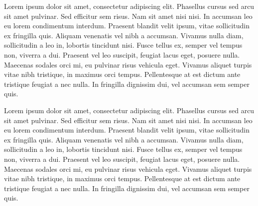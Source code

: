 Lorem ipsum dolor sit amet, consectetur adipiscing elit. Phasellus cursus sed arcu sit amet pulvinar. Sed efficitur sem risus. Nam sit amet nisi nisi. In accumsan leo eu lorem condimentum interdum. Praesent blandit velit ipsum, vitae sollicitudin ex fringilla quis. Aliquam venenatis vel nibh a accumsan. Vivamus nulla diam, sollicitudin a leo in, lobortis tincidunt nisi. Fusce tellus ex, semper vel tempus non, viverra a dui. Praesent vel leo suscipit, feugiat lacus eget, posuere nulla. Maecenas sodales orci mi, eu pulvinar risus vehicula eget. Vivamus aliquet turpis vitae nibh tristique, in maximus orci tempus. Pellentesque at est dictum ante tristique feugiat a nec nulla. In fringilla dignissim dui, vel accumsan sem semper quis.

Lorem ipsum dolor sit amet, consectetur adipiscing elit. Phasellus cursus sed arcu sit amet pulvinar. Sed efficitur sem risus. Nam sit amet nisi nisi. In accumsan leo eu lorem condimentum interdum. Praesent blandit velit ipsum, vitae sollicitudin ex fringilla quis. Aliquam venenatis vel nibh a accumsan. Vivamus nulla diam, sollicitudin a leo in, lobortis tincidunt nisi. Fusce tellus ex, semper vel tempus non, viverra a dui. Praesent vel leo suscipit, feugiat lacus eget, posuere nulla. Maecenas sodales orci mi, eu pulvinar risus vehicula eget. Vivamus aliquet turpis vitae nibh tristique, in maximus orci tempus. Pellentesque at est dictum ante tristique feugiat a nec nulla. In fringilla dignissim dui, vel accumsan sem semper quis.
